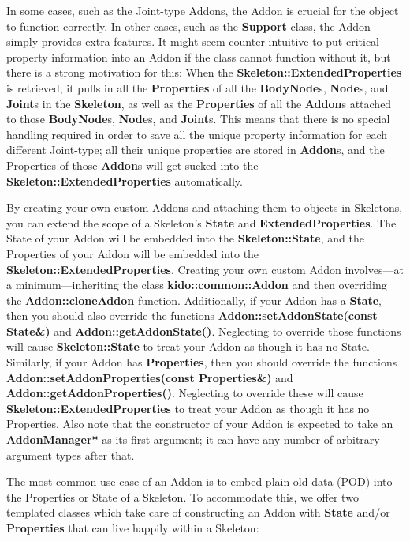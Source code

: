 In some cases, such as the Joint-type Addons, the Addon is crucial for the object to function correctly. In other cases, such as the \textbf{Support} class, the Addon simply provides extra features. It might seem counter-intuitive to put critical property information into an Addon if the class cannot function without it, but there is a strong motivation for this: When the \textbf{Skeleton::ExtendedProperties} is retrieved, it pulls in all the \textbf{Properties} of all the \textbf{BodyNode}s, \textbf{Node}s, and \textbf{Joint}s in the \textbf{Skeleton}, as well as the \textbf{Properties} of all the \textbf{Addon}s attached to those \textbf{BodyNode}s, \textbf{Node}s, and \textbf{Joint}s. This means that there is no special handling required in order to save all the unique property information for each different Joint-type; all their unique properties are stored in \textbf{Addon}s, and the Properties of those \textbf{Addon}s will get sucked into the \textbf{Skeleton::ExtendedProperties} automatically.

By creating your own custom Addons and attaching them to objects in Skeletons, you can extend the scope of a Skeleton's \textbf{State} and \textbf{ExtendedProperties}. The State of your Addon will be embedded into the \textbf{Skeleton::State}, and the Properties of your Addon will be embedded into the \textbf{Skeleton::ExtendedProperties}. Creating your own custom Addon involves---at a minimum---inheriting the class \textbf{kido::common::Addon} and then overriding the \textbf{Addon::cloneAddon} function. Additionally, if your Addon has a \textbf{State}, then you should also override the functions \textbf{Addon::setAddonState(const State\&)} and \textbf{Addon::getAddonState()}. Neglecting to override those functions will cause \textbf{Skeleton::State} to treat your Addon as though it has no State. Similarly, if your Addon has \textbf{Properties}, then you should override the functions \textbf{Addon::setAddonProperties(const Properties\&)} and \textbf{Addon::getAddonProperties()}. Neglecting to override these will cause \textbf{Skeleton::ExtendedProperties} to treat your Addon as though it has no Properties. Also note that the constructor of your Addon is expected to take an \textbf{AddonManager*} as its first argument; it can have any number of arbitrary argument types after that.

The most common use case of an Addon is to embed plain old data (POD) into the Properties or State of a Skeleton. To accommodate this, we offer two templated classes which take care of constructing an Addon with \textbf{State} and/or \textbf{Properties} that can live happily within a Skeleton:

